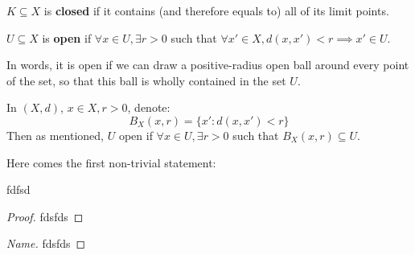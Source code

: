 \begin{definition} 
$K \subseteq X$ is \textbf{closed} if it contains (and therefore equals to) all of its limit points.
\end{definition}

\begin{definition} 
$U \subseteq X$ is \textbf{open} if $\forall x \in U, \exists r > 0$ such that $\forall x' \in X, d(x, x') < r \implies x' \in U$.

In words, it is open if we can draw a positive-radius open ball around every point of the set, so that this ball is wholly contained in the set $U$.
\end{definition}

\begin{notation}
In $(X, d)$, $x \in X, r > 0$, denote: \[
B_X(x, r) = \{x' : d(x, x') < r\}
\]
Then as mentioned, $U$ open if $\forall x \in U, \exists r > 0$ such that $B_X(x, r) \subseteq U$.
\end{notation}

Here comes the first non-trivial statement:
\begin{proposition}
fdfsd
\end{proposition}

\begin{proof}
fdsfds
\end{proof}

\begin{proof} [Name]
    fdsfds
\end{proof}


